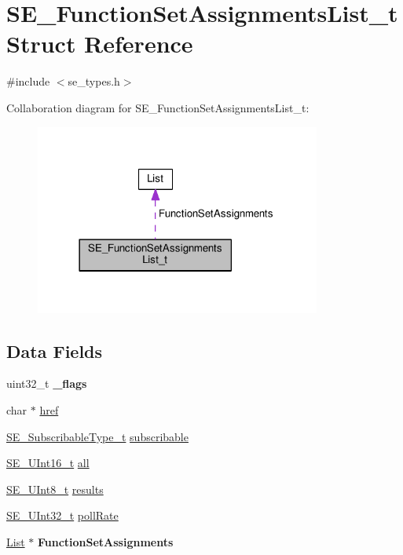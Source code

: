 \hypertarget{structSE__FunctionSetAssignmentsList__t}{}\section{S\+E\+\_\+\+Function\+Set\+Assignments\+List\+\_\+t Struct Reference}
\label{structSE__FunctionSetAssignmentsList__t}


{\ttfamily \#include $<$se\+\_\+types.\+h$>$}



Collaboration diagram for S\+E\+\_\+\+Function\+Set\+Assignments\+List\+\_\+t\+:\nopagebreak
\begin{figure}[H]
\begin{center}
\leavevmode
\includegraphics[width=266pt]{structSE__FunctionSetAssignmentsList__t__coll__graph}
\end{center}
\end{figure}
\subsection*{Data Fields}
\begin{DoxyCompactItemize}
\item 
uint32\+\_\+t {\bfseries \+\_\+flags}
\item 
char $\ast$ \hyperlink{group__FunctionSetAssignmentsList_ga68247d187c62acc81cce9a7d85ad209b}{href}
\item 
\hyperlink{group__SubscribableType_ga5c41f553d369710ed34619266bf2551e}{S\+E\+\_\+\+Subscribable\+Type\+\_\+t} \hyperlink{group__FunctionSetAssignmentsList_ga52f70232590c8b6c1b9d368bffbfa680}{subscribable}
\item 
\hyperlink{group__UInt16_gac68d541f189538bfd30cfaa712d20d29}{S\+E\+\_\+\+U\+Int16\+\_\+t} \hyperlink{group__FunctionSetAssignmentsList_gaa3cb8c5a55ac18b63bd2582417f168e0}{all}
\item 
\hyperlink{group__UInt8_gaf7c365a1acfe204e3a67c16ed44572f5}{S\+E\+\_\+\+U\+Int8\+\_\+t} \hyperlink{group__FunctionSetAssignmentsList_ga38dcb9244c2fd218072dcfa083d510d8}{results}
\item 
\hyperlink{group__UInt32_ga70bd4ecda3c0c85d20779d685a270cdb}{S\+E\+\_\+\+U\+Int32\+\_\+t} \hyperlink{group__FunctionSetAssignmentsList_gab2f324d046132de9d38914b6d93d2155}{poll\+Rate}
\item 
\hyperlink{structList}{List} $\ast$ {\bfseries Function\+Set\+Assignments}
\end{DoxyCompactItemize}


